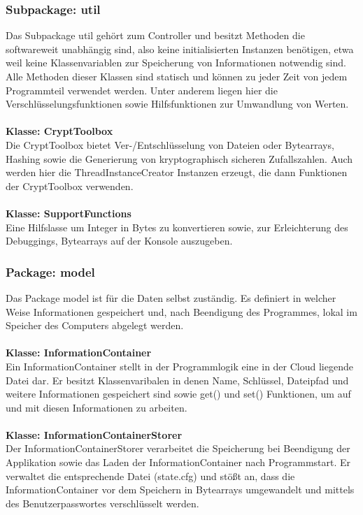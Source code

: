\documentclass[13pt,a4paper,bibliography=totocnumbered,listof=totocnumbered]{scrartcl}
\begin{document}
\subsubsection{Subpackage: util}
Das Subpackage util gehört zum Controller und besitzt Methoden die softwareweit unabhängig sind, also keine initialisierten Instanzen benötigen, etwa weil keine Klassenvariablen zur Speicherung von Informationen notwendig sind. Alle Methoden dieser Klassen sind statisch und können zu jeder Zeit von jedem Programmteil verwendet werden. Unter anderem liegen hier die Verschlüsselungsfunktionen sowie Hilfsfunktionen zur Umwandlung von Werten.\\\\
\textbf{Klasse: CryptToolbox}\\
Die CryptToolbox bietet Ver-/Entschlüsselung von Dateien oder Bytearrays, Hashing sowie die Generierung von kryptographisch sicheren Zufallszahlen. Auch werden hier die ThreadInstanceCreator Instanzen erzeugt, die dann Funktionen der CryptToolbox verwenden.\\\\
\textbf{Klasse: SupportFunctions}\\
Eine Hilfslasse um Integer in Bytes zu konvertieren sowie, zur Erleichterung des Debuggings, Bytearrays auf der Konsole auszugeben.

\subsubsection{Package: model}
Das Package model ist für die Daten selbst zuständig. Es definiert in welcher Weise Informationen gespeichert und, nach Beendigung des Programmes, lokal im Speicher des Computers abgelegt werden.\\\\
\textbf{Klasse: InformationContainer}\\
Ein InformationContainer stellt in der Programmlogik eine in der Cloud liegende Datei dar. Er besitzt Klassenvaribalen in denen Name, Schlüssel, Dateipfad und weitere Informationen gespeichert sind sowie get() und set() Funktionen, um auf und mit diesen Informationen zu arbeiten.\\\\
\textbf{Klasse: InformationContainerStorer}\\
Der InformationContainerStorer verarbeitet die Speicherung bei Beendigung der Applikation sowie das Laden der InformationContainer nach Programmstart. Er verwaltet die entsprechende Datei (state.cfg) und stößt an, dass die  InformationContainer vor dem Speichern in Bytearrays umgewandelt und mittels des Benutzerpasswortes verschlüsselt werden.
\end{document}
